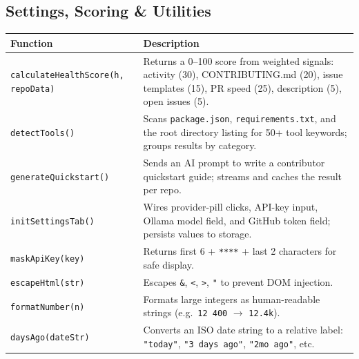 \documentclass[11pt,a4paper]{article}
\begin{document}
\subsection{Settings, Scoring \& Utilities}

\begin{longtable}{L{5.2cm} L{8.3cm}}
    \toprule
    \textbf{Function} & \textbf{Description} \\
    \midrule
    \endhead
    \bottomrule
    \endfoot

    \texttt{calculateHealthScore(h, repoData)} &
        Returns a 0--100 score from weighted signals: activity (30), CONTRIBUTING.md (20), issue templates (15), PR speed (25), description (5), open issues (5). \\
    \addlinespace

    \texttt{detectTools()} &
        Scans \texttt{package.json}, \texttt{requirements.txt}, and the root directory listing for 50+ tool keywords; groups results by category. \\
    \addlinespace

    \texttt{generateQuickstart()} &
        Sends an AI prompt to write a contributor quickstart guide; streams and caches the result per repo. \\
    \addlinespace

    \texttt{initSettingsTab()} &
        Wires provider-pill clicks, API-key input, Ollama model field, and GitHub token field; persists values to storage. \\
    \addlinespace

    \texttt{maskApiKey(key)} &
        Returns first 6 + \texttt{****} + last 2 characters for safe display. \\
    \addlinespace

    \texttt{escapeHtml(str)} &
        Escapes \texttt{\&}, \texttt{<}, \texttt{>}, \texttt{"} to prevent DOM injection. \\
    \addlinespace

    \texttt{formatNumber(n)} &
        Formats large integers as human-readable strings (e.g.\ \texttt{12\,400} $\rightarrow$ \texttt{12.4k}). \\
    \addlinespace

    \texttt{daysAgo(dateStr)} &
        Converts an ISO date string to a relative label: \texttt{"today"}, \texttt{"3 days ago"}, \texttt{"2mo ago"}, etc. \\
\end{longtable}
\end{document}
